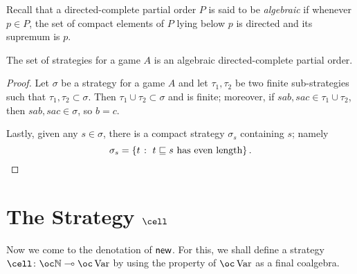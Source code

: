 \documentclass[11pt]{report}
\begin{document}
Recall that a directed-complete partial order $P$ is said to be \emph{algebraic} if whenever $p\in P$, the set of compact elements of $P$ lying below $p$ is directed and its supremum is $p$.  

\begin{proposition}
  The set of strategies for a game $A$ is an algebraic directed-complete partial order.
\end{proposition}
\begin{proof}
  Let $\sigma$ be a strategy for a game $A$ and let $\tau_1,\tau_2$ be two finite sub-strategies such that $\tau_1,\tau_2\subset\sigma$.  
  Then $\tau_1\cup\tau_2\subset\sigma$ and is finite; moreover, if $sab,sac\in\tau_1\cup\tau_2$, then $sab,sac\in\sigma$, so $b=c$.  

  Lastly, given any $s\in\sigma$, there is a compact strategy $\sigma_s$ containing $s$; namely
  \[
    \sigma_s = \{t\;\colon\; \text{$t\sqsubseteq s$ has even length}\}\,.\qedhere
    \]
\end{proof}

\section{The Strategy $\cell$}
\label{SecCell}

Now we come to the denotation of $\operatorname{{\mathsf{new}}}$.  
For this, we shall define a strategy $\cell\from \oc\bN \implies \oc \Varr$ by using the property of $\oc \Varr$ as a final coalgebra.
\end{document}
